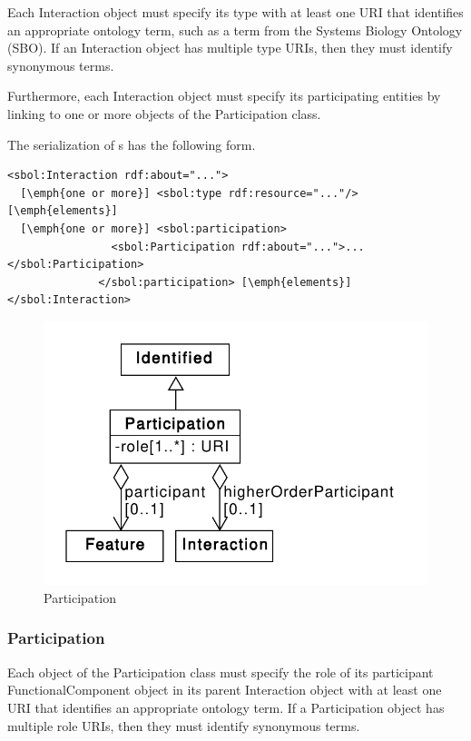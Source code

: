 Each Interaction object must specify its type with at least one URI that identifies an appropriate ontology term, such as a term from the Systems Biology Ontology (SBO). If an Interaction object has multiple type URIs, then they must identify synonymous terms. 

Furthermore, each Interaction object must specify its participating  entities by linking to one or more objects of the Participation class.

The serialization of s has the following form.
\begin{lstlisting}
<sbol:Interaction rdf:about="...">
  [\emph{one or more}] <sbol:type rdf:resource="..."/> [\emph{elements}]
  [\emph{one or more}] <sbol:participation>
                <sbol:Participation rdf:about="...">...</sbol:Participation>
              </sbol:participation> [\emph{elements}]
</sbol:Interaction>
\end{lstlisting}



\begin{figure}[ht]
\begin{center}
\includegraphics[scale=0.6]{uml/participation}
\caption[]{Participation}
\label{uml:participation}
\end{center}
\end{figure}

\subsubsection{Participation}
\label{sec:Participation}
Each object of the Participation class must specify the role of its participant FunctionalComponent object in its parent Interaction object with at least one URI that identifies an appropriate ontology term. If a Participation object has multiple role URIs, then they must identify synonymous terms. 

